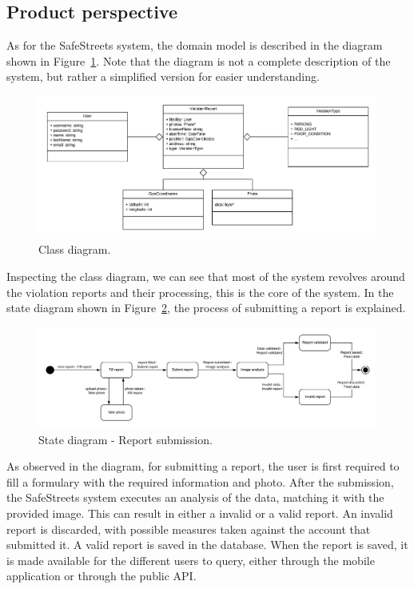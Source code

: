 \subsection{Product perspective}

As for the SafeStreets system, the domain model is described in the diagram shown in Figure~\ref{fig:class-general}. Note that the diagram is not a complete description of the system, but rather a simplified version for easier understanding.

\begin{figure}[!h]
\centering
\includegraphics[width=\textwidth]{Images/class-general.png}
\caption{\label{fig:class-general}Class diagram.}
\end{figure}

Inspecting the class diagram, we can see that most of the system revolves around the violation reports and their processing, this is the core of the system.
In the state diagram shown in Figure~\ref{fig:state-report-submission}, the process of submitting a report is explained.

\begin{figure}[!h]
\centering
\includegraphics[width=\textwidth]{Images/state-report-submission.png}
\caption{\label{fig:state-report-submission}State diagram - Report submission.}
\end{figure}

As observed in the diagram, for submitting a report, the user is first required to fill a formulary with the required information and photo. After the submission, the SafeStreets system executes an analysis of the data, matching it with the provided image. This can result in either a invalid or a valid report. An invalid report is discarded, with possible measures taken against the account that submitted it. A valid report is saved in the database. When the report is saved, it is made available for the different users to query, either through the mobile application or through the public API.

